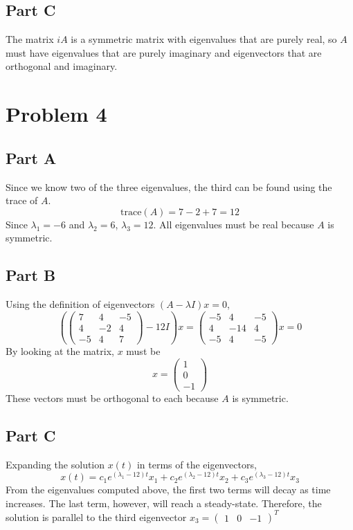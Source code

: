 \documentclass{article}
\begin{document}
\subsection*{Part C}

The matrix $iA$ is a symmetric matrix with eigenvalues that are purely real,
so $A$ must have eigenvalues that are purely imaginary and eigenvectors that
are orthogonal and imaginary.

\section*{Problem 4}

\subsection*{Part A}

Since we know two of the three eigenvalues, the third can be found using the
trace of $A$.
$$ \mathrm{trace}(A) = 7 - 2 + 7 = 12 $$
Since $\lambda_1 = -6$ and $\lambda_2 = 6$, $\lambda_3 = 12$. All eigenvalues
must be real because $A$ is symmetric.

\subsection*{Part B}

Using the definition of eigenvectors $(A - \lambda I) x = 0$,
$$ \left(\begin{pmatrix}
  7 & 4 & -5 \\
  4 & -2 & 4 \\
  -5 & 4 & 7
\end{pmatrix} - 12 I\right) x = \begin{pmatrix}
  -5 & 4 & -5 \\
  4 & -14 & 4 \\
  -5 & 4 & -5
\end{pmatrix} x = 0 $$
By looking at the matrix, $x$ must be
$$ x = \begin{pmatrix}
  1 \\
  0 \\
  -1
\end{pmatrix} $$
These vectors must be orthogonal to each because $A$ is symmetric.

\subsection*{Part C}

Expanding the solution $x(t)$ in terms of the eigenvectors,
$$ x(t) = c_1 e^{(\lambda_1 - 12) t} x_1 + c_2 e^{(\lambda_2 - 12) t} x_2 +
c_3 e^{(\lambda_3 - 12) t} x_3 $$
From the eigenvalues computed above, the first two terms will decay as time
increases. The last term, however, will reach a steady-state. Therefore, the
solution is parallel to the third eigenvector $x_3 = \begin{pmatrix} 1 & 0 &
-1 \end{pmatrix}^T$
\end{document}
